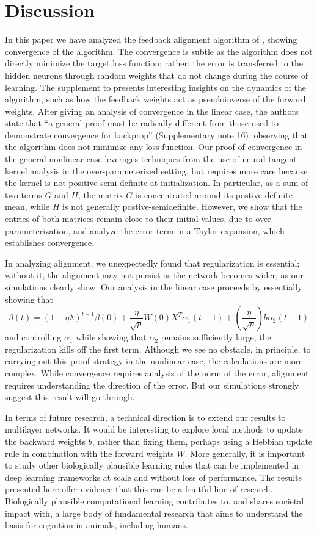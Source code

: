 \section{Discussion}

In this paper we have analyzed the feedback alignment algorithm of
\cite{lillicrap2016random}, showing convergence of the algorithm. The convergence is subtle as the algorithm does not directly minimize the target loss function; rather, the error is transferred to the hidden neurons through random weights that do not change during the course of learning.
The supplement to \cite{lillicrap2016random} presents interesting insights on the dynamics of the algorithm, such as how the feedback weights act as pseudoinverse of the forward weights. After giving an analysis of convergence in the linear case, the authors state that
``a general proof must be radically different from those used to demonstrate convergence for backprop'' (Supplementary note 16), observing that the algorithm does not minimize any loss function. Our proof of convergence in the general nonlinear case leverages techniques from
the use of neural tangent kernel analysis in the over-parameterized setting, but requires more care because the kernel is not positive semi-definite at initialization. In particular, as a sum of two terms $G$ and $H$, the matrix $G$ is concentrated around its postive-definite mean, while $H$ is not generally postive-semidefinite. However, we show that the entries of both matrices remain close to their initial values, due to over-parameterization, and analyze the error term in a Taylor expansion, which establishes convergence.

In analyzing alignment, we unexpectedly found that regularization is essential; without it, the alignment may not persist as the network becomes wider, as our simulations clearly show.
Our analysis in the linear case proceeds by essentially showing that
$$\beta(t) = (1-\eta \lambda)^{t-1} \beta(0) + \frac{\eta}{\sqrt{p}} W(0) X^T \alpha_1(t-1) +
\left(\frac{\eta}{\sqrt{p}} \right) b \alpha_2(t-1)$$
and controlling $\alpha_1$ while showing that $\alpha_2$ remains sufficiently large; the
regularization kills off the first term.
Although we see no obstacle, in principle, to carrying out this proof strategy in the nonlinear
case, the calculations are more complex. While convergence requires analysis of the norm of the error, alignment requires understanding the direction of the error. But our simulations strongly suggest this result will go through.

In terms of future research, a technical direction is to extend our results to multilayer networks. It would be interesting to explore local methods to update the backward weights $b$, rather than fixing them, perhaps using a Hebbian update rule in combination with the forward weights $W$. More generally, it is important to study other biologically plausible learning rules that can be implemented in deep learning frameworks at scale and without loss of performance.  The results presented here offer evidence that this can be a fruitful line of research. Biologically plausible computational learning contributes to, and shares societal impact with, a large body of fundamental research that aims to understand the basis for cognition in animals, including humans.
